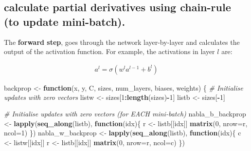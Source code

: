 \documentclass[]{book}
\newenvironment{Shaded}{\begin{snugshade}}{\end{snugshade}}
\newcommand{\CommentTok}[1]{\textcolor[rgb]{0.56,0.35,0.01}{\textit{#1}}}
\newcommand{\ControlFlowTok}[1]{\textcolor[rgb]{0.13,0.29,0.53}{\textbf{#1}}}
\newcommand{\DataTypeTok}[1]{\textcolor[rgb]{0.13,0.29,0.53}{#1}}
\newcommand{\DecValTok}[1]{\textcolor[rgb]{0.00,0.00,0.81}{#1}}
\newcommand{\KeywordTok}[1]{\textcolor[rgb]{0.13,0.29,0.53}{\textbf{#1}}}
\newcommand{\NormalTok}[1]{#1}
\newcommand{\OperatorTok}[1]{\textcolor[rgb]{0.81,0.36,0.00}{\textbf{#1}}}
\newcommand{\StringTok}[1]{\textcolor[rgb]{0.31,0.60,0.02}{#1}}
\begin{document}
\hypertarget{calculate-partial-derivatives-using-chain-rule-to-update-mini-batch.}{%
\subsection{calculate partial derivatives using chain-rule (to update mini-batch).}\label{calculate-partial-derivatives-using-chain-rule-to-update-mini-batch.}}

The \textbf{forward step}, goes through the network layer-by-layer and calculates the output of the activation function. For example, the activations in layer \(l\) are:

\[\begin{aligned} 
   a^l = \sigma(w^la^{l-1}+b^l)
\end{aligned}\]

\begin{Shaded}
\begin{Highlighting}[]
\NormalTok{backprop <-}\StringTok{ }\ControlFlowTok{function}\NormalTok{(x, y, C, sizes, num_layers, biases, weights)}
\NormalTok{\{}
  \CommentTok{# Initialise updates with zero vectors}
\NormalTok{  listw <-}\StringTok{ }\NormalTok{sizes[}\DecValTok{1}\OperatorTok{:}\KeywordTok{length}\NormalTok{(sizes)}\OperatorTok{-}\DecValTok{1}\NormalTok{] }
\NormalTok{  listb <-}\StringTok{  }\NormalTok{sizes[}\OperatorTok{-}\DecValTok{1}\NormalTok{]  }
  
  \CommentTok{# Initialise updates with zero vectors (for EACH mini-batch)}
\NormalTok{  nabla_b_backprop <-}\StringTok{ }\KeywordTok{lapply}\NormalTok{(}\KeywordTok{seq_along}\NormalTok{(listb), }\ControlFlowTok{function}\NormalTok{(idx)\{}
\NormalTok{    r <-}\StringTok{ }\NormalTok{listb[[idx]]}
    \KeywordTok{matrix}\NormalTok{(}\DecValTok{0}\NormalTok{, }\DataTypeTok{nrow=}\NormalTok{r, }\DataTypeTok{ncol=}\DecValTok{1}\NormalTok{)}
\NormalTok{  \})}
\NormalTok{  nabla_w_backprop <-}\StringTok{ }\KeywordTok{lapply}\NormalTok{(}\KeywordTok{seq_along}\NormalTok{(listb), }\ControlFlowTok{function}\NormalTok{(idx)\{}
\NormalTok{    c <-}\StringTok{ }\NormalTok{listw[[idx]]}
\NormalTok{    r <-}\StringTok{ }\NormalTok{listb[[idx]]}
    \KeywordTok{matrix}\NormalTok{(}\DecValTok{0}\NormalTok{, }\DataTypeTok{nrow=}\NormalTok{r, }\DataTypeTok{ncol=}\NormalTok{c)}
\NormalTok{  \})  }
  

\end{Highlighting}
\end{Shaded}
\end{document}

